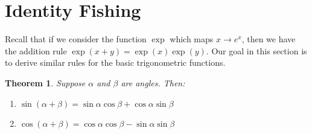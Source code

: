 \documentclass[a4paper,leqno]{article}
\numberwithin{equation}{section}
\newtheorem{thm}[equation]{Theorem}
\theoremstyle{definition}
\theoremstyle{remark}
\begin{document}
\section{Identity Fishing}
Recall that if we consider the function $ \exp $ which maps $ x \to e^x $, then we have the addition rule $ \exp(x + y) = \exp(x) \exp(y) $. Our
goal in this section is to derive similar rules for the basic trigonometric functions.

\begin{thm}\leavevmode\label{thm:sumids}
  Suppose $ \alpha $ and $ \beta $ are angles. Then:
  \begin{enumerate}
    \item $ \sin(\alpha + \beta) = \sin \alpha \cos \beta + \cos \alpha \sin \beta $
    \item $ \cos(\alpha + \beta) = \cos \alpha \cos \beta - \sin \alpha \sin \beta $
  \end{enumerate}
\end{thm}
\end{document}
